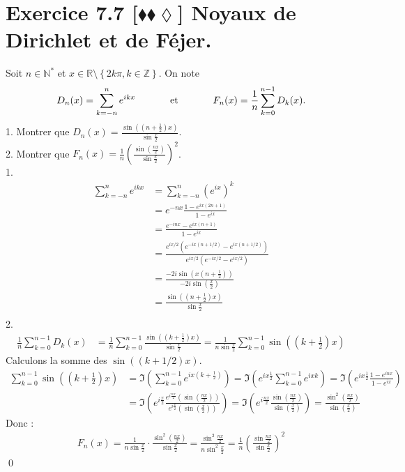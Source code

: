 \documentclass[10pt]{article}
\begin{document}
\section*{Exercice 7.7 [$\blacklozenge\blacklozenge\lozenge$] Noyaux de Dirichlet et de Féjer.}
\begin{tcolorbox}[enhanced, width=7in, center, size=fbox, fontupper=\large, drop shadow southwest]
    Soit $n\in\mathbb{N}^*$ et $x\in\mathbb{R} \setminus \left\{ 2k\pi, k\in\mathbb{Z} \right\}$. On note
    \begin{equation*}
        D_n(x) = \sum_{k=-n}^{n}{e^{ikx}} \hspace{1.25cm} \text{et} \hspace{1.25cm} F_n(x) = \frac{1}{n}\sum_{k=0}^{n-1}{D_k(x)}.
    \end{equation*}
    1. Montrer que $D_n(x)=\frac{\sin\left( (n+\frac{1}{2})x \right)}{\sin\frac{x}{2}}$.\\
    2. Montrer que $F_n(x)=\frac{1}{n}\left( \frac{\sin\left( \frac{nx}{2} \right)}{\sin\frac{x}{2}} \right)^2$.\\
    1. 
    \begin{align*}
        \sum_{k=-n}^{n}{e^{ikx}}&=\sum_{k=-n}^{n}{\left(e^{ix}\right)^k}\\
        &=e^{-nx}\frac{1-e^{ix(2n+1)}}{1-e^{ix}}\\
        &=\frac{e^{-inx}-e^{ix(n+1)}}{1-e^{ix}}\\
        &=\frac{e^{ix/2}(e^{-ix(n+1/2)}-e^{ix(n+1/2)})}{e^{ix/2}(e^{-ix/2}-e^{ix/2})}\\
        &=\frac{-2i\sin(x(n+\frac{1}{2}))}{-2i\sin(\frac{x}{2})}\\
        &=\frac{\sin((n+\frac{1}{2})x)}{\sin\frac{x}{2}}\\
    \end{align*}
    2.
    \begin{align*}
        \frac{1}{n}\sum_{k=0}^{n-1}{D_k(x)} &= \frac{1}{n}\sum_{k=0}^{n-1}{\frac{\sin((k+\frac{1}{2})x)}{\sin\frac{x}{2}}}=\frac{1}{n\sin\frac{x}{2}}\sum_{k=0}^{n-1}{\sin((k+\frac{1}{2})x)}
    \end{align*}
    Calculons la somme des $\sin((k+1/2)x)$.
    \begin{align*}
        \sum^{n-1}_{k=0}{\sin((k+\frac{1}{2})x)}&=\Im\left( \sum_{k=0}^{n-1}{e^{ix(k+\frac{1}{2})}} \right) = \Im\left( e^{ix\frac{1}{2}}\sum_{k=0}^{n-1}{e^{ixk}} \right) = \Im\left( e^{ix\frac{1}{2}}\frac{1-e^{inx}}{1-e^{ix}} \right)\\
        &= \Im\left( e^{i\frac{x}{2}}\frac{e^{i\frac{nx}{2}}(\sin(\frac{nx}{2}))}{e^{i\frac{x}{2}}(\sin(\frac{x}{2}))} \right) = \Im\left(e^{i\frac{nx}{2}}\frac{\sin(\frac{nx}{2})}{\sin(\frac{x}{2})}\right)=\frac{\sin^2(\frac{nx}{2})}{\sin(\frac{x}{2})}
    \end{align*}
    Donc :
    \begin{align*}
        F_n(x)=\frac{1}{n\sin\frac{x}{2}}\cdot\frac{\sin^2(\frac{nx}{2})}{\sin\frac{x}{2}}=\frac{\sin^2\frac{nx}{2}}{n\sin^2\frac{x}{2}}=\frac{1}{n}\left(\frac{\sin\frac{nx}{2}}{\sin\frac{x}{2}}\right)^2
    \end{align*}
    \qed
\end{tcolorbox}

\end{document}
